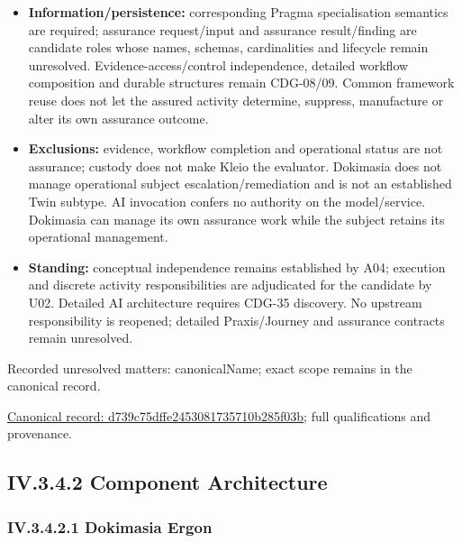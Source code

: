 \begin{itemize}
\item \textbf{Information/persistence:} corresponding Pragma specialisation semantics are
  required; assurance request/input and assurance result/finding are candidate
  roles whose names, schemas, cardinalities and lifecycle remain unresolved.
  Evidence-access/control independence, detailed workflow composition and durable
  structures remain CDG-08/09. Common framework reuse does not let the assured
  activity determine, suppress, manufacture or alter its own assurance outcome.

\item \textbf{Exclusions:} evidence, workflow completion and operational status are not
  assurance; custody does not make Kleio the evaluator. Dokimasia does not manage
  operational subject escalation/remediation and is not an established Twin subtype.
  AI invocation confers no authority on the model/service. Dokimasia can manage
  its own assurance work while the subject retains its operational management.

\item \textbf{Standing:} conceptual independence remains established by A04; execution
  and discrete activity responsibilities are adjudicated for the candidate by U02.
  Detailed AI architecture requires CDG-35 discovery. No upstream responsibility
  is reopened; detailed Praxis/Journey and assurance contracts remain unresolved.

\end{itemize}

{\small Recorded unresolved matters: canonicalName; exact scope remains in the canonical record.}\par
{\footnotesize \href{../../../../continuum/application/application-component/d739c75dffe2453081735710b285f03b.md}{Canonical record: d739c75dffe2453081735710b285f03b}; full qualifications and provenance.}\par
\subsection*{IV.3.4.2 Component Architecture}
\label{navigation:IV.3.4.2}

\subsubsection*{IV.3.4.2.1 Dokimasia Ergon}
\label{navigation:IV.3.4.2.1}

